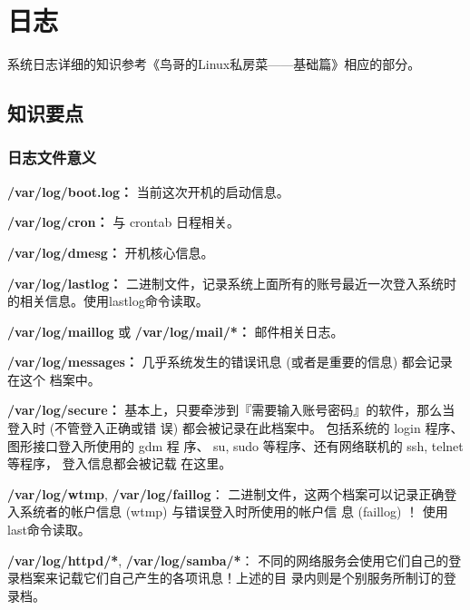 ﻿\chapter{日志}

系统日志详细的知识参考《鸟哥的Linux私房菜——基础篇》相应的部分。

\section{知识要点}

\subsection{日志文件意义}

\begin{itemize*}
    \item \textbf{/var/log/boot.log：}%
当前这次开机的启动信息。

    \item \textbf{/var/log/cron：}%
与 crontab 日程相关。

    \item \textbf{/var/log/dmesg：}%
开机核心信息。

    \item \textbf{/var/log/lastlog：}%
二进制文件，记录系统上面所有的账号最近一次登入系统时的相关信息。使用lastlog命令读取。

    \item \textbf{/var/log/maillog} 或 \textbf{/var/log/mail/*：}%
邮件相关日志。

    \item \textbf{/var/log/messages：}%
几乎系统发生的错误讯息 (或者是重要的信息) 都会记录在这个
档案中。

    \item \textbf{/var/log/secure：}
基本上，只要牵涉到『需要输入账号密码』的软件，那么当登入时 (不管登入正确或错
误) 都会被记录在此档案中。 包括系统的 login 程序、图形接口登入所使用的 gdm 程
序、 su, sudo 等程序、还有网络联机的 ssh, telnet 等程序， 登入信息都会被记载
在这里。

    \item \textbf{/var/log/wtmp}, \textbf{/var/log/faillog}：
二进制文件，这两个档案可以记录正确登入系统者的帐户信息 (wtmp) 与错误登入时所使用的帐户信
息 (faillog) ！ 使用last命令读取。

    \item \textbf{/var/log/httpd/*}, \textbf{/var/log/samba/*}：
不同的网络服务会使用它们自己的登录档案来记载它们自己产生的各项讯息！上述的目
录内则是个别服务所制订的登录档。

\end{itemize*}


